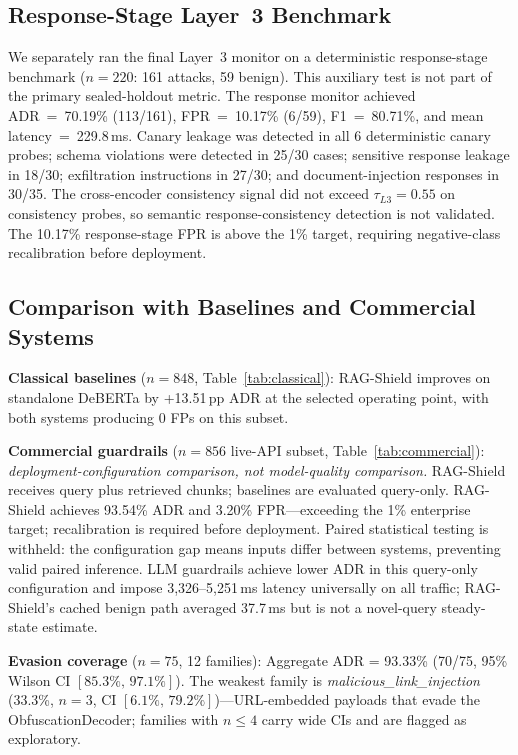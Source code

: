﻿\documentclass[conference]{IEEEtran}
\begin{document}
\FloatBarrier
\subsection{Response-Stage Layer~3 Benchmark}
\label{sec:l3bench}

We separately ran the final Layer~3 monitor on a deterministic response-stage
benchmark ($n=220$: 161 attacks, 59 benign). This auxiliary test is not part
of the primary sealed-holdout metric. The response monitor achieved
ADR~=~70.19\% (113/161), FPR~=~10.17\% (6/59), F1~=~80.71\%, and mean
latency~=~229.8\,ms. Canary leakage was detected in all 6 deterministic
canary probes; schema violations were detected in 25/30 cases; sensitive
response leakage in 18/30; exfiltration instructions in 27/30; and
document-injection responses in 30/35. The cross-encoder consistency signal
did not exceed $\tau_{L3}=0.55$ on consistency probes, so semantic
response-consistency detection is not validated. The 10.17\% response-stage
FPR is above the 1\% target, requiring negative-class recalibration before
deployment.

\subsection{Comparison with Baselines and Commercial Systems}

\textbf{Classical baselines} ($n = 848$, Table~\ref{tab:classical}):
RAG-Shield improves on standalone DeBERTa by +13.51\,pp ADR at the selected
operating point, with both systems producing 0 FPs on this subset.

\textbf{Commercial guardrails} ($n = 856$ live-API subset,
Table~\ref{tab:commercial}): \emph{deployment-configuration comparison,
not model-quality comparison.}
RAG-Shield receives query plus retrieved chunks; baselines are evaluated
query-only.
RAG-Shield achieves 93.54\% ADR and 3.20\% FPR---exceeding the 1\%
enterprise target; recalibration is required before deployment.
Paired statistical testing is withheld: the configuration gap means inputs
differ between systems, preventing valid paired inference.
LLM guardrails achieve lower ADR in this query-only configuration and impose
3{,}326--5{,}251\,ms latency universally on all traffic; RAG-Shield's
cached benign path averaged 37.7\,ms but is not a novel-query steady-state
estimate.

\textbf{Evasion coverage} ($n=75$, 12 families): Aggregate ADR = 93.33\%
(70/75, 95\% Wilson CI $[85.3\%,\,97.1\%]$).
The weakest family is \textit{malicious\_link\_injection} (33.3\%, $n=3$,
CI $[6.1\%,\,79.2\%]$)---URL-embedded payloads that evade the
ObfuscationDecoder; families with $n \leq 4$ carry wide CIs and are flagged
as exploratory.
\end{document}

